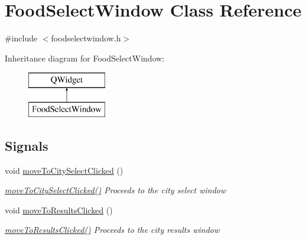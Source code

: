 \hypertarget{class_food_select_window}{}\section{Food\+Select\+Window Class Reference}
\label{class_food_select_window}


{\ttfamily \#include $<$foodselectwindow.\+h$>$}

Inheritance diagram for Food\+Select\+Window\+:\begin{figure}[H]
\begin{center}
\leavevmode
\includegraphics[height=2.000000cm]{class_food_select_window}
\end{center}
\end{figure}
\subsection*{Signals}
\begin{DoxyCompactItemize}
\item 
void \mbox{\hyperlink{class_food_select_window_a0d2bb2f7e07f62e62c2920d989415d8c}{move\+To\+City\+Select\+Clicked}} ()
\begin{DoxyCompactList}\small\item\em \mbox{\hyperlink{class_food_select_window_a0d2bb2f7e07f62e62c2920d989415d8c}{move\+To\+City\+Select\+Clicked()}} Proceeds to the city select window \end{DoxyCompactList}\item 
void \mbox{\hyperlink{class_food_select_window_a76b0dfec8f72dfa4c336732a922287fc}{move\+To\+Results\+Clicked}} ()
\begin{DoxyCompactList}\small\item\em \mbox{\hyperlink{class_food_select_window_a76b0dfec8f72dfa4c336732a922287fc}{move\+To\+Results\+Clicked()}} Proceeds to the city results window \end{DoxyCompactList}\end{DoxyCompactItemize}
